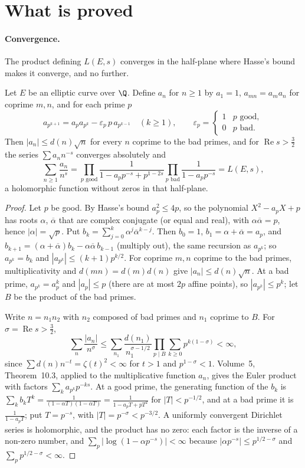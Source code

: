 \section{What is proved}

\paragraph{Convergence.} The product defining $L(E,s)$ converges in the half-plane where Hasse's bound makes it converge, and no further.

\begin{proposition}\label{conjectures:prop:eulerconv}
Let $E$ be an elliptic curve over $\Q$. Define $a_n$ for $n\ge1$ by $a_1=1$, $a_{mn}=a_ma_n$ for coprime $m,n$, and for each prime $p$
\[
a_{p^{k+1}}=a_pa_{p^k}-\varepsilon_p\,p\,a_{p^{k-1}}\quad(k\ge1),\qquad\varepsilon_p=\begin{cases}1&p\text{ good},\\0&p\text{ bad}.\end{cases}
\]
Then $|a_n|\le d(n)\sqrt n$ for every $n$ coprime to the bad primes, and for $\operatorname{Re}s>\frac32$ the series $\sum a_nn^{-s}$ converges absolutely and
\[
\sum_{n\ge1}\frac{a_n}{n^s}=\prod_{p\text{ good}}\frac1{1-a_pp^{-s}+p^{1-2s}}\prod_{p\text{ bad}}\frac1{1-a_pp^{-s}}=L(E,s),
\]
a holomorphic function without zeros in that half-plane.
\end{proposition}
\begin{proof}
Let $p$ be good. By Hasse's bound $a_p^2\le4p$, so the polynomial $X^2-a_pX+p$ has roots $\alpha$, $\overline\alpha$ that are complex conjugate (or equal and
real), with $\alpha\overline\alpha=p$, hence $|\alpha|=\sqrt p$. Put $b_k=\sum_{j=0}^k\alpha^j\overline\alpha^{k-j}$. Then $b_0=1$, $b_1=\alpha+\overline\alpha=a_p$,
and $b_{k+1}=(\alpha+\overline\alpha)b_k-\alpha\overline\alpha\,b_{k-1}$ (multiply out), the same recursion as $a_{p^k}$; so $a_{p^k}=b_k$ and $|a_{p^k}|\le(k+1)p^{k/2}$.
For coprime $m,n$ coprime to the bad primes, multiplicativity and $d(mn)=d(m)d(n)$ give $|a_n|\le d(n)\sqrt n$. At a bad prime, $a_{p^k}=a_p^k$ and
$|a_p|\le p$ (there are at most $2p$ affine points), so $|a_{p^k}|\le p^k$; let $B$ be the product of the bad primes.

Write $n=n_1n_2$ with $n_2$ composed of bad primes and $n_1$ coprime to $B$. For $\sigma=\operatorname{Re}s>\frac32$,
\[
\sum_n\frac{|a_n|}{n^\sigma}\le\sum_{n_1}\frac{d(n_1)}{n_1^{\sigma-1/2}}\prod_{p\mid B}\sum_{k\ge0}p^{k(1-\sigma)}<\infty,
\]
since $\sum d(n)n^{-t}=\zeta(t)^2<\infty$ for $t>1$ and $p^{1-\sigma}<1$. Volume~5, Theorem~10.3, applied to the multiplicative function $a_n$, gives the Euler
product with factors $\sum_ka_{p^k}p^{-ks}$. At a good prime, the generating function of the $b_k$ is
$\sum_kb_kT^k=\frac1{(1-\alpha T)(1-\overline\alpha T)}=\frac1{1-a_pT+pT^2}$ for $|T|<p^{-1/2}$, and at a bad prime it is $\frac1{1-a_pT}$; put $T=p^{-s}$,
with $|T|=p^{-\sigma}<p^{-3/2}$. A uniformly convergent Dirichlet series is holomorphic, and the product has no zero: each factor is the inverse of a
non-zero number, and $\sum_p|\log(1-\alpha p^{-s})|<\infty$ because $|\alpha p^{-s}|\le p^{1/2-\sigma}$ and $\sum_pp^{1/2-\sigma}<\infty$.
\end{proof}

